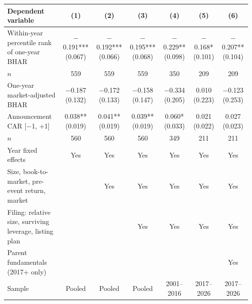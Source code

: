 \begin{tabular}{>{\raggedright\arraybackslash}p{5.4cm}cccccc}
\toprule
Dependent variable & (1) & (2) & (3) & (4) & (5) & (6) \\
\midrule
Within-year percentile rank of one-year BHAR & $-$0.191*** (0.067) & $-$0.192*** (0.066) & $-$0.195*** (0.068) & $-$0.229** (0.098) & $-$0.168* (0.101) & $-$0.207** (0.104) \\
\quad $n$ & 559 & 559 & 559 & 350 & 209 & 209 \\
One-year market-adjusted BHAR & $-$0.187 (0.132) & $-$0.172 (0.133) & $-$0.158 (0.147) & $-$0.334 (0.205) & 0.010 (0.223) & $-$0.123 (0.253) \\
Announcement CAR [$-$1, +1] & 0.038** (0.019) & 0.041** (0.019) & 0.039** (0.019) & 0.060* (0.033) & 0.021 (0.022) & 0.027 (0.023) \\
\quad $n$ & 560 & 560 & 560 & 349 & 211 & 211 \\
\midrule
Year fixed effects & Yes & Yes & Yes & Yes & Yes & Yes \\
Size, book-to-market, pre-event return, market & & Yes & Yes & Yes & Yes & Yes \\
Filing: relative size, surviving leverage, listing plan & & & Yes & Yes & Yes & Yes \\
Parent fundamentals (2017+ only) & & & & & & Yes \\
Sample & Pooled & Pooled & Pooled & 2001--2016 & 2017--2026 & 2017--2026 \\
\bottomrule
\end{tabular}
